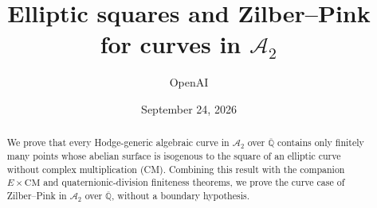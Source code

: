 \documentclass[11pt]{article}
\title{Elliptic squares and Zilber--Pink for curves in $\mathcal A_2$}
\author{OpenAI}
\date{September 24, 2026}
\begin{document}
\maketitle
\begin{abstract}
We prove that every Hodge-generic algebraic curve in $\mathcal A_2$ over
$\overline{\mathbb Q}$ contains only finitely many points whose abelian
surface is isogenous to the square of an elliptic curve without complex
multiplication (CM). Combining this result with the companion
$E\times\mathrm{CM}$ and quaternionic-division finiteness theorems, we prove
the curve case of Zilber--Pink in $\mathcal A_2$ over
$\overline{\mathbb Q}$, without a boundary hypothesis.
\end{abstract}
\tableofcontents








\appendix

\clearpage
{}
{}


\end{document}
